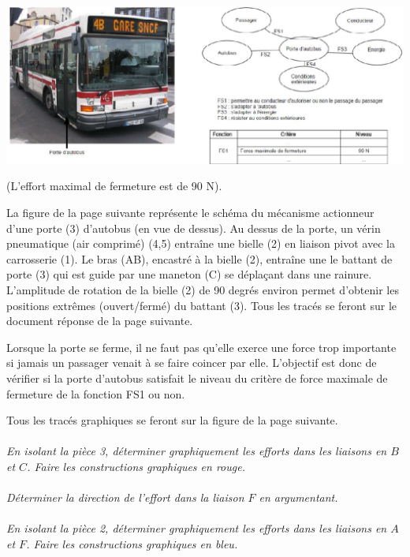 \documentclass[11pt,oneside]{article}
\begin{document}
\begin{center}
\includegraphics[width=.9\textwidth]{png/img1.png}
\end{center}

(L'effort maximal de fermeture est de 90\; N).

La figure de la page suivante représente le schéma du mécanisme actionneur d'une porte (3) d'autobus (en vue de dessus). Au dessus de la porte, un vérin pneumatique (air comprimé) (4,5) entraîne une bielle (2) en liaison pivot avec la carrosserie (1). Le bras (AB), encastré à la bielle (2), entraîne une le battant de porte (3) qui est guide par une maneton (C) se déplaçant dans une rainure. L'amplitude de rotation de la bielle (2) de 90 degrés environ permet d'obtenir les positions extrêmes (ouvert/fermé) du battant (3). Tous les tracés se feront sur le document réponse de la page suivante. 

Lorsque la porte se ferme, il ne faut pas qu'elle exerce une force trop importante si jamais un passager venait à se faire coincer par elle. L'objectif est donc de vérifier si la porte d'autobus satisfait le niveau du critère de force maximale de fermeture de la fonction FS1 ou non.

Tous les tracés graphiques se feront sur la figure de la page suivante. 

\paragraph{}
\textit{En isolant la pièce 3, déterminer graphiquement les efforts dans les liaisons en $B$ et $C$. Faire les constructions graphiques en rouge.}

\paragraph{}
\textit{Déterminer la direction de l'effort dans la liaison $F$ en argumentant.}

\paragraph{}
\textit{En isolant la pièce 2, déterminer graphiquement les efforts dans les liaisons en $A$ et $F$. Faire les constructions graphiques en bleu.}
\end{document}
